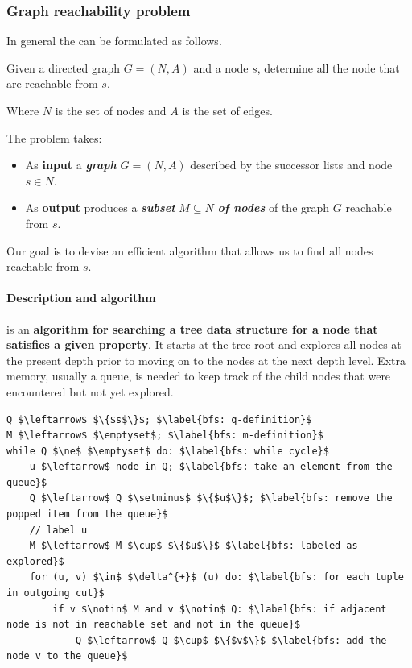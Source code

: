 \longline

\subsubsection{Graph reachability problem}

In general the  can be formulated as follows.

\begin{definitionbox}
    Given a directed graph $G = \left(N,A\right)$ and a node $s$, determine all the node that are reachable from $s$.
\end{definitionbox}

\noindent
Where $N$ is the set of nodes and $A$ is the set of edges.

\highspace
The problem takes:
\begin{itemize}
    \item As \textbf{input} a \emph{\textbf{graph}} $G = \left(N,A\right)$ described by the successor lists and node $s \in N$.
    
    \item As \textbf{output} produces a \emph{\textbf{subset}} $M \subseteq N$ \emph{\textbf{of nodes}} of the graph $G$ reachable from $s$.
\end{itemize}
Our goal is to devise an efficient algorithm that allows us to find all nodes reachable from $s$.

\newpage

\paragraph{Description and algorithm}

\begin{definitionbox}
     is an \textbf{algorithm for searching a tree data structure for a node that satisfies a given property}. It starts at the tree root and explores all nodes at the present depth prior to moving on to the nodes at the next depth level. Extra memory, usually a queue, is needed to keep track of the child nodes that were encountered but not yet explored.
\end{definitionbox}

\begin{lstlisting}[language=pseudo-code, caption={Graph reachability problem: Breadth-First Search}]
Q $\leftarrow$ $\{$s$\}$; $\label{bfs: q-definition}$
M $\leftarrow$ $\emptyset$; $\label{bfs: m-definition}$
while Q $\ne$ $\emptyset$ do: $\label{bfs: while cycle}$
    u $\leftarrow$ node in Q; $\label{bfs: take an element from the queue}$
    Q $\leftarrow$ Q $\setminus$ $\{$u$\}$; $\label{bfs: remove the popped item from the queue}$
    // label u
    M $\leftarrow$ M $\cup$ $\{$u$\}$ $\label{bfs: labeled as explored}$
    for (u, v) $\in$ $\delta^{+}$ (u) do: $\label{bfs: for each tuple in outgoing cut}$
        if v $\notin$ M and v $\notin$ Q: $\label{bfs: if adjacent node is not in reachable set and not in the queue}$
            Q $\leftarrow$ Q $\cup$ $\{$v$\}$ $\label{bfs: add the node v to the queue}$
\end{lstlisting}

